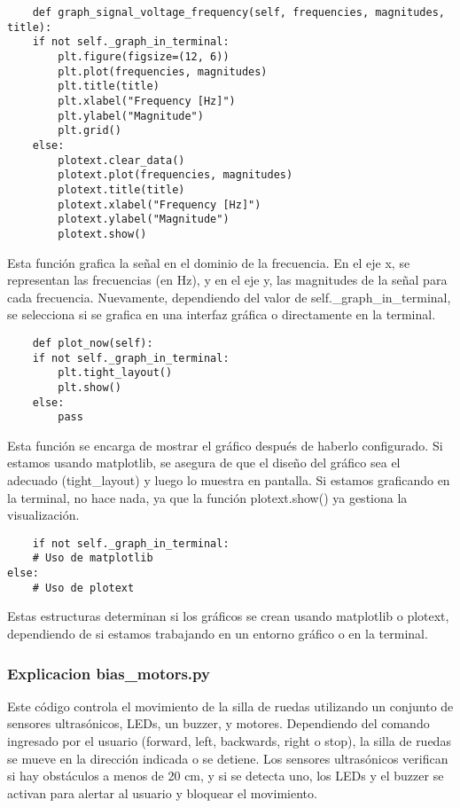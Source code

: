 \documentclass{article}
\begin{document}
\begin{lstlisting}
    def graph_signal_voltage_frequency(self, frequencies, magnitudes, title):
    if not self._graph_in_terminal:
        plt.figure(figsize=(12, 6))
        plt.plot(frequencies, magnitudes)
        plt.title(title)
        plt.xlabel("Frequency [Hz]")
        plt.ylabel("Magnitude")
        plt.grid()
    else:
        plotext.clear_data()
        plotext.plot(frequencies, magnitudes)
        plotext.title(title)
        plotext.xlabel("Frequency [Hz]")
        plotext.ylabel("Magnitude")
        plotext.show()
\end{lstlisting}
Esta función grafica la señal en el dominio de la frecuencia. En el eje x, se representan las frecuencias (en Hz), y en el eje y, las magnitudes de la señal para cada frecuencia. Nuevamente, dependiendo del valor de self.\_graph\_in\_terminal, se selecciona si se grafica en una interfaz gráfica o directamente en la terminal.

\begin{lstlisting}
    def plot_now(self):
    if not self._graph_in_terminal:
        plt.tight_layout()
        plt.show()
    else:
        pass
\end{lstlisting}
Esta función se encarga de mostrar el gráfico después de haberlo configurado. Si estamos usando matplotlib, se asegura de que el diseño del gráfico sea el adecuado (tight\_layout) y luego lo muestra en pantalla. Si estamos graficando en la terminal, no hace nada, ya que la función plotext.show() ya gestiona la visualización.

\begin{lstlisting}
    if not self._graph_in_terminal:
    # Uso de matplotlib
else:
    # Uso de plotext
\end{lstlisting}
Estas estructuras determinan si los gráficos se crean usando matplotlib o plotext, dependiendo de si estamos trabajando en un entorno gráfico o en la terminal.

\subsubsection{Explicacion bias\_motors.py}
Este código controla el movimiento de la silla de ruedas utilizando un conjunto de sensores ultrasónicos, LEDs, un buzzer, y motores. Dependiendo del comando ingresado por el usuario (forward, left, backwards, right o stop), la silla de ruedas se mueve en la dirección indicada o se detiene. Los sensores ultrasónicos verifican si hay obstáculos a menos de 20 cm, y si se detecta uno, los LEDs y el buzzer se activan para alertar al usuario y bloquear el movimiento.
\end{document}
